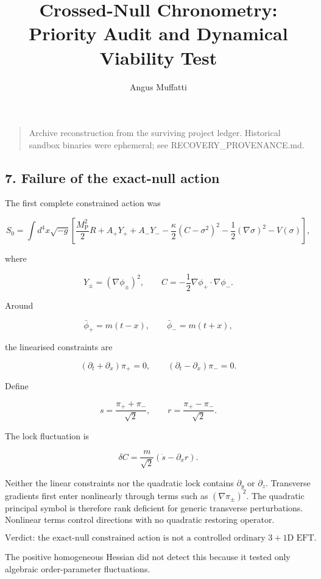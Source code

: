 \documentclass[
]{article}
\title{Crossed-Null Chronometry: Priority Audit and Dynamical Viability
Test}
\author{Angus Muffatti}
\date{}
\begin{document}
\maketitle

\begin{quote}
Archive reconstruction from the surviving project ledger. Historical
sandbox binaries were ephemeral; see RECOVERY\_PROVENANCE.md.
\end{quote}

\hypertarget{failure-of-the-exact-null-action}{%
\subsection{7. Failure of the exact-null
action}\label{failure-of-the-exact-null-action}}

The first complete constrained action was

\[
S_0=\int d^4x\sqrt{-g}\left[
\frac{M_{\mathrm{P}}^2}{2}R
+A_+Y_++A_-Y_-
-\frac\kappa2(C-\sigma^2)^2
-\frac12(\nabla\sigma)^2
-V(\sigma)
\right],
\]

where

\[
Y_\pm=(\nabla\phi_\pm)^2,
\qquad
C=-\frac12\nabla\phi_+\cdot\nabla\phi_-.
\]

Around

\[
\bar\phi_+=m(t-x),
\qquad
\bar\phi_-=m(t+x),
\]

the linearised constraints are

\[
(\partial_t+\partial_x)\pi_+=0,
\qquad
(\partial_t-\partial_x)\pi_-=0.
\]

Define

\[
s=\frac{\pi_++\pi_-}{\sqrt2},
\qquad
r=\frac{\pi_+-\pi_-}{\sqrt2}.
\]

The lock fluctuation is

\[
\delta C=\frac{m}{\sqrt2}(\dot s-\partial_x r).
\]

Neither the linear constraints nor the quadratic lock contains
\(\partial_y\) or \(\partial_z\). Transverse gradients first enter
nonlinearly through terms such as \((\nabla\pi_\pm)^2\). The quadratic
principal symbol is therefore rank deficient for generic transverse
perturbations. Nonlinear terms control directions with no quadratic
restoring operator.

\[
\boxed{
\text{Verdict: the exact-null constrained action is not a controlled ordinary }3+1\text{D EFT.}
}
\]

The positive homogeneous Hessian did not detect this because it tested
only algebraic order-parameter fluctuations.
\end{document}
